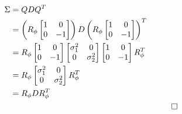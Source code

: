 \documentclass[a4paper, 12pt]{report}
\begin{document}
\begin{align}
	\Sigma&=QDQ^T \\
	&= \left(R_\phi \begin{bmatrix}
		1  &  0  \\
		0  &  -1
	\end{bmatrix}\right)D\left(R_\phi \begin{bmatrix}
		1  &  0  \\
		0  &  -1
	\end{bmatrix}\right)^T \\
	&= R_\phi \begin{bmatrix}
		1  &  0  \\
		0  &  -1
	\end{bmatrix} \begin{bmatrix}
		\sigma_1^2  &  0  \\
		0  &  \sigma_2^2
	\end{bmatrix} \begin{bmatrix}
		1  &  0  \\
		0  &  -1
	\end{bmatrix} R_\phi^T \\
	&= R_\phi \begin{bmatrix}
		\sigma_1^2  &  0  \\
		0  &  \sigma_2^2
	\end{bmatrix} R_\phi^T \\
	&= R_\phi D R_\phi^T \\&&\qed\nonumber
\end{align}

\newpage
\end{document}

